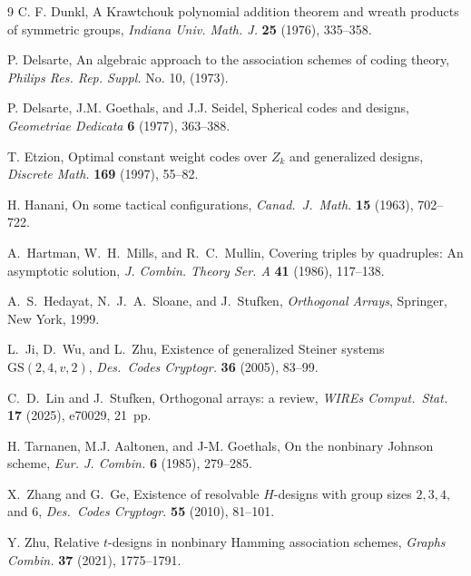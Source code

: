 \documentclass[a4paper, 11pt]{article}
\theoremstyle{definition}
\begin{document}
\begin{thebibliography}{9}
C. F. Dunkl,
A Krawtchouk polynomial addition theorem and wreath products of symmetric groups,
{\it Indiana Univ. Math. J.} \textbf{25} (1976), 335--358.


P. Delsarte, 
An algebraic approach to the association schemes of
coding theory, 
{\it Philips Res. Rep. Suppl.} No. 10, (1973).

P. Delsarte, J.M. Goethals, and J.J. Seidel,
Spherical codes and designs,
{\it Geometriae Dedicata} {\bf 6} (1977), 363--388.


T. Etzion, Optimal constant weight codes over $Z_k$ and generalized designs,
{\it Discrete Math.} \textbf{169} (1997), 55--82.

 H. Hanani, On some tactical configurations, {\it Canad.\ J.\ Math.} \textbf{15} (1963), 702–722.



A.~Hartman, W.~H.~Mills, and R.~C.~Mullin,
Covering triples by quadruples: An asymptotic solution,
{\it J. Combin. Theory Ser. A} \textbf{41} (1986), 117--138.

A.~S.~Hedayat, N.~J.~A.~Sloane, and J.~Stufken,
{\it Orthogonal Arrays},
Springer, New York, 1999.


L.~Ji, D.~Wu, and L.~Zhu,
Existence of generalized Steiner systems $\mathrm{GS}(2,4,v,2)$,
{\it Des.\ Codes Cryptogr.} \textbf{36} (2005), 83--99.

C.~D.~Lin and J.~Stufken,
Orthogonal arrays: a review,
{\it WIREs Comput.\ Stat.} \textbf{17} (2025), e70029, 21~pp.


H. Tarnanen, M.J. Aaltonen, and J-M. Goethals, On the nonbinary Johnson scheme, {\it Eur. J. Combin.} {\bf 6} (1985), 279--285.


X.~Zhang and G.~Ge,
Existence of resolvable $H$-designs with group sizes $2,3,4,$ and $6$,
{\it Des.\ Codes Cryptogr.} \textbf{55} (2010), 81--101.


Y. Zhu, Relative $t$-designs in nonbinary Hamming association schemes, {\it Graphs Combin.} {\bf 37} (2021), 1775--1791.




\end{thebibliography}
\end{document}
